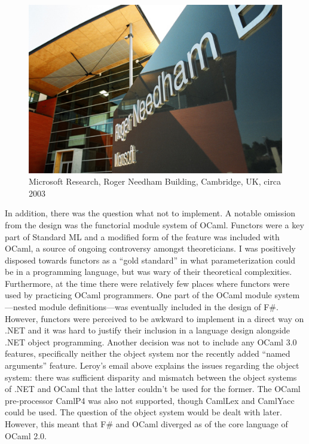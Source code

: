 \documentclass[acmsmall,screen]{acmart}
\begin{document}
\begin{figure}
  \begin{center}
  \includegraphics[width=0.9\linewidth]{msft.jpg}
  \end{center}
  \caption{Microsoft Research, Roger Needham Building, Cambridge, UK, circa 2003}
  \label{fig:msft}
\end{figure}


In addition, there was the question what not to implement.  A notable omission from the design was the functorial module system of
OCaml.  Functors were a key part of Standard ML and a modified form of the feature was included with OCaml, a source of ongoing
controversy amongst theoreticians.  I was positively disposed towards functors as a “gold standard” in what parameterization could
be in a programming language, but was wary of their theoretical complexities. Furthermore, at the time there were relatively few places
where functors were used by practicing OCaml programmers. One part of the OCaml module system---nested module definitions---was
eventually included in the design of F\#.  However, functors were perceived to be awkward to implement in a direct way on .NET and it
was hard to justify their inclusion in a language design alongside .NET object programming. Another decision was not to include any
OCaml 3.0 features, specifically neither the object system nor the recently added “named arguments” feature.  Leroy’s email above explains
the issues regarding the object system: there was sufficient disparity and mismatch between the object systems of .NET and OCaml that
the latter couldn’t be used for the former.  The OCaml pre-processor CamlP4 was also not supported, though CamlLex and CamlYacc could
be used. The question of the object system would be dealt with later.  However, this meant that F\# and OCaml diverged as of the core language of OCaml 2.0.
\end{document}
